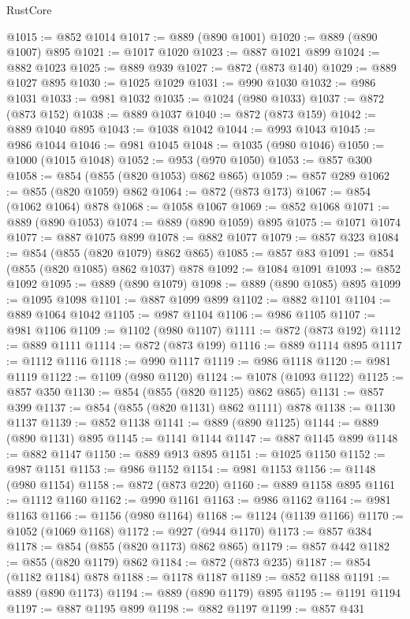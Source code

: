 \begin{lexlean}{RustCore}
\begin{coremodule}
@1015 := @852 @1014
@1017 := @889 (@890 @1001)
@1020 := @889 (@890 @1007) @895
@1021 := @1017 @1020
@1023 := @887 @1021 @899
@1024 := @882 @1023
@1025 := @889 @939
@1027 := @872 (@873 @140)
@1029 := @889 @1027 @895
@1030 := @1025 @1029
@1031 := @990 @1030
@1032 := @986 @1031
@1033 := @981 @1032
@1035 := @1024 (@980 @1033)
@1037 := @872 (@873 @152)
@1038 := @889 @1037
@1040 := @872 (@873 @159)
@1042 := @889 @1040 @895
@1043 := @1038 @1042
@1044 := @993 @1043
@1045 := @986 @1044
@1046 := @981 @1045
@1048 := @1035 (@980 @1046)
@1050 := @1000 (@1015 @1048)
@1052 := @953 (@970 @1050)
@1053 := @857 @300
@1058 := @854 (@855 (@820 @1053) @862 @865)
@1059 := @857 @289
@1062 := @855 (@820 @1059) @862
@1064 := @872 (@873 @173)
@1067 := @854 (@1062 @1064) @878
@1068 := @1058 @1067
@1069 := @852 @1068
@1071 := @889 (@890 @1053)
@1074 := @889 (@890 @1059) @895
@1075 := @1071 @1074
@1077 := @887 @1075 @899
@1078 := @882 @1077
@1079 := @857 @323
@1084 := @854 (@855 (@820 @1079) @862 @865)
@1085 := @857 @83
@1091 := @854 (@855 (@820 @1085) @862 @1037) @878
@1092 := @1084 @1091
@1093 := @852 @1092
@1095 := @889 (@890 @1079)
@1098 := @889 (@890 @1085) @895
@1099 := @1095 @1098
@1101 := @887 @1099 @899
@1102 := @882 @1101
@1104 := @889 @1064 @1042
@1105 := @987 @1104
@1106 := @986 @1105
@1107 := @981 @1106
@1109 := @1102 (@980 @1107)
@1111 := @872 (@873 @192)
@1112 := @889 @1111
@1114 := @872 (@873 @199)
@1116 := @889 @1114 @895
@1117 := @1112 @1116
@1118 := @990 @1117
@1119 := @986 @1118
@1120 := @981 @1119
@1122 := @1109 (@980 @1120)
@1124 := @1078 (@1093 @1122)
@1125 := @857 @350
@1130 := @854 (@855 (@820 @1125) @862 @865)
@1131 := @857 @399
@1137 := @854 (@855 (@820 @1131) @862 @1111) @878
@1138 := @1130 @1137
@1139 := @852 @1138
@1141 := @889 (@890 @1125)
@1144 := @889 (@890 @1131) @895
@1145 := @1141 @1144
@1147 := @887 @1145 @899
@1148 := @882 @1147
@1150 := @889 @913 @895
@1151 := @1025 @1150
@1152 := @987 @1151
@1153 := @986 @1152
@1154 := @981 @1153
@1156 := @1148 (@980 @1154)
@1158 := @872 (@873 @220)
@1160 := @889 @1158 @895
@1161 := @1112 @1160
@1162 := @990 @1161
@1163 := @986 @1162
@1164 := @981 @1163
@1166 := @1156 (@980 @1164)
@1168 := @1124 (@1139 @1166)
@1170 := @1052 (@1069 @1168)
@1172 := @927 (@944 @1170)
@1173 := @857 @384
@1178 := @854 (@855 (@820 @1173) @862 @865)
@1179 := @857 @442
@1182 := @855 (@820 @1179) @862
@1184 := @872 (@873 @235)
@1187 := @854 (@1182 @1184) @878
@1188 := @1178 @1187
@1189 := @852 @1188
@1191 := @889 (@890 @1173)
@1194 := @889 (@890 @1179) @895
@1195 := @1191 @1194
@1197 := @887 @1195 @899
@1198 := @882 @1197
@1199 := @857 @431

\end{coremodule}
\end{lexlean}
